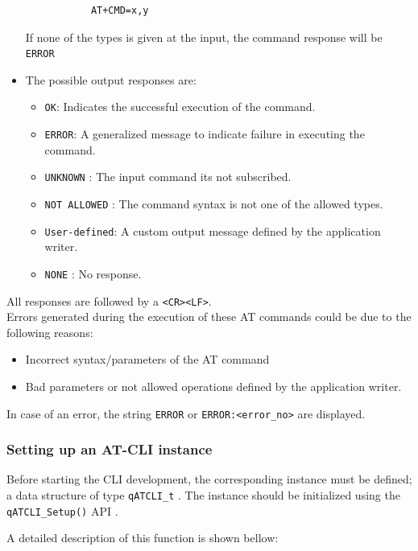 \documentclass{article}
\begin{document}
\begin{itemize}
\begin{itemize}
        \begin{lstlisting}
        AT+CMD=x,y
        \end{lstlisting}
    \end{itemize}
    If none of the types is given at the input, the command response will be \lstinline{ERROR}
    \item The possible output responses are:
    \begin{itemize}
        \item \lstinline{OK}: Indicates the successful execution of the command.
        \item \lstinline{ERROR}: A generalized message to indicate failure in executing the command. 
        \item \lstinline{UNKNOWN} : The input command its not subscribed.
        \item \lstinline{NOT ALLOWED} : The command syntax is not one of the allowed types.
        \item \lstinline{User-defined}: A custom output message defined by the application writer.
        \item \lstinline{NONE} : No response.
    \end{itemize}
\end{itemize}

All responses are followed by a \lstinline{<CR><LF>}. \\

Errors generated during the execution of these AT commands could be due to the following reasons:
\begin{itemize}
    \item Incorrect syntax/parameters of the AT command
    \item Bad parameters or not allowed operations defined by the application writer.
\end{itemize}

In case of an error, the string \lstinline{ERROR} or \lstinline{ERROR:<error_no>} are displayed.

\subsubsection{Setting up an AT-CLI instance}
Before starting the CLI development, the corresponding instance must be defined; a data structure of type \lstinline{qATCLI_t} . 
The instance should be initialized using the \lstinline{qATCLI_Setup()} API .

A detailed description of this function is shown bellow:  \\
\end{document}
